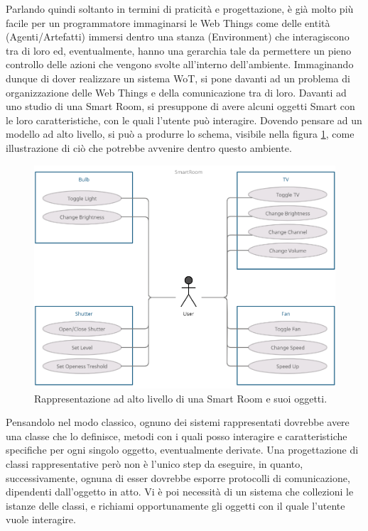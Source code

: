 \documentclass[12pt,a4paper,openright,oneside]{report}
\begin{document}
Parlando quindi soltanto in termini di praticità e progettazione, è già molto più facile per un programmatore immaginarsi le Web Things come delle entità (Agenti/Artefatti) immersi dentro una stanza (Environment) che interagiscono tra di loro ed, eventualmente, hanno una gerarchia tale da permettere un pieno controllo delle azioni che vengono svolte all'interno dell'ambiente. Immaginando dunque di dover realizzare un sistema WoT, si pone davanti ad un problema di organizzazione delle Web Things e della comunicazione tra di loro. Davanti ad uno studio di una Smart Room, si presuppone di avere alcuni oggetti Smart con le loro caratteristiche, con le quali l'utente può interagire. Dovendo pensare ad un modello ad alto livello, si può a produrre lo schema, visibile nella figura \ref{fig:use-case-diagram-high}, come illustrazione di ciò che potrebbe avvenire dentro questo ambiente.\\

\begin{figure}[h]
	\centering
	\includegraphics[scale=0.5]{eps/use-case-high-agent-simple.png}
	\caption{Rappresentazione ad alto livello di una Smart Room e suoi oggetti.}
	\label{fig:use-case-diagram-high}
\end{figure}

Pensandolo nel modo classico, ognuno dei sistemi rappresentati dovrebbe avere una classe che lo definisce, metodi con i quali posso interagire e caratteristiche specifiche per ogni singolo oggetto, eventualmente derivate. Una progettazione di classi rappresentative però non è l'unico step da eseguire, in quanto, successivamente, ognuna di esser dovrebbe esporre protocolli di comunicazione, dipendenti dall'oggetto in atto. Vi è poi necessità di un sistema che collezioni le istanze delle classi, e richiami opportunamente gli oggetti con il quale l'utente vuole interagire.\\
\end{document}
